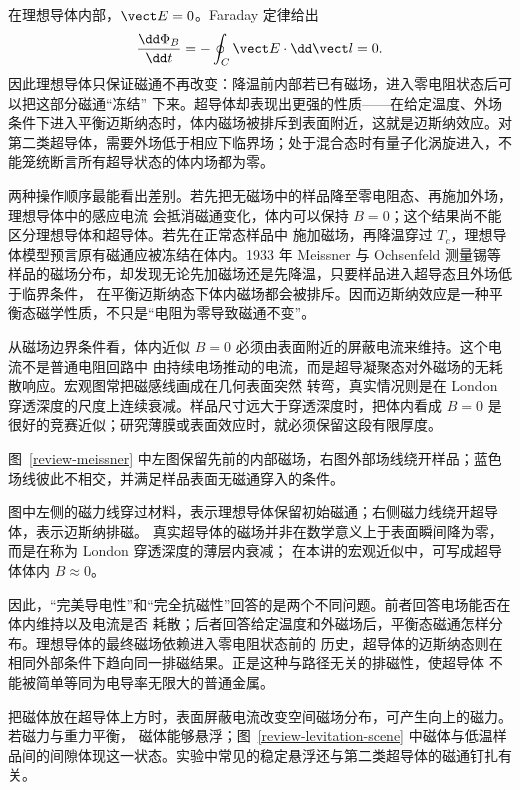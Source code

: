 在理想导体内部，$\vect E=0$。Faraday 定律给出
\begin{equation}
  \frac{\dd\Phi_B}{\dd t}=-\oint_C\vect E\cdot\dd\vect l=0.
\end{equation}
因此理想导体只保证磁通不再改变：降温前内部若已有磁场，进入零电阻状态后可以把这部分磁通“冻结”
下来。超导体却表现出更强的性质——在给定温度、外场条件下进入平衡迈斯纳态时，体内磁场被排斥到表面附近，这就是迈斯纳效应。对第二类超导体，需要外场低于相应下临界场；处于混合态时有量子化涡旋进入，不能笼统断言所有超导状态的体内场都为零。

两种操作顺序最能看出差别。若先把无磁场中的样品降至零电阻态、再施加外场，理想导体中的感应电流
会抵消磁通变化，体内可以保持 $B=0$；这个结果尚不能区分理想导体和超导体。若先在正常态样品中
施加磁场，再降温穿过 $T_c$，理想导体模型预言原有磁通应被冻结在体内。1933 年 Meissner 与 Ochsenfeld
测量锡等样品的磁场分布，却发现无论先加磁场还是先降温，只要样品进入超导态且外场低于临界条件，
在平衡迈斯纳态下体内磁场都会被排斥。因而迈斯纳效应是一种平衡态磁学性质，不只是“电阻为零导致磁通不变”。

从磁场边界条件看，体内近似 $B=0$ 必须由表面附近的屏蔽电流来维持。这个电流不是普通电阻回路中
由持续电场推动的电流，而是超导凝聚态对外磁场的无耗散响应。宏观图常把磁感线画成在几何表面突然
转弯，真实情况则是在 London 穿透深度的尺度上连续衰减。样品尺寸远大于穿透深度时，把体内看成
$B=0$ 是很好的竞赛近似；研究薄膜或表面效应时，就必须保留这段有限厚度。

图~\ref{review-meissner} 中左图保留先前的内部磁场，右图外部场线绕开样品；蓝色场线彼此不相交，并满足样品表面无磁通穿入的条件。

\meissnerComparisonDiagram

图中左侧的磁力线穿过材料，表示理想导体保留初始磁通；右侧磁力线绕开超导体，表示迈斯纳排磁。
真实超导体的磁场并非在数学意义上于表面瞬间降为零，而是在称为 London 穿透深度的薄层内衰减；
在本讲的宏观近似中，可写成超导体体内 $B\approx0$。

因此，“完美导电性”和“完全抗磁性”回答的是两个不同问题。前者回答电场能否在体内维持以及电流是否
耗散；后者回答给定温度和外磁场后，平衡态磁通怎样分布。理想导体的最终磁场依赖进入零电阻状态前的
历史，超导体的迈斯纳态则在相同外部条件下趋向同一排磁结果。正是这种与路径无关的排磁性，使超导体
不能被简单等同为电导率无限大的普通金属。

把磁体放在超导体上方时，表面屏蔽电流改变空间磁场分布，可产生向上的磁力。若磁力与重力平衡，
磁体能够悬浮；图~\ref{review-levitation-scene} 中磁体与低温样品间的间隙体现这一状态。实验中常见的稳定悬浮还与第二类超导体的磁通钉扎有关。

